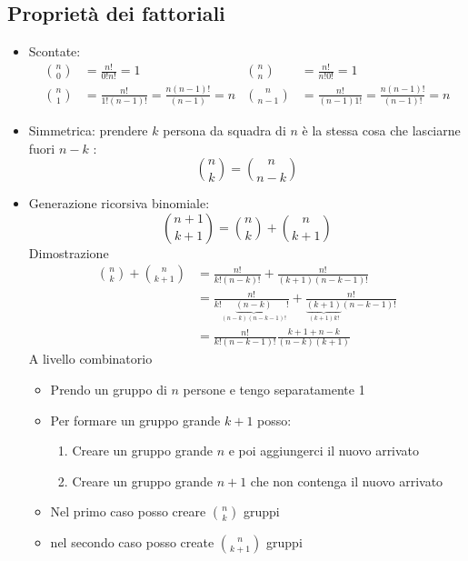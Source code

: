 \subsection{Proprietà dei fattoriali}
\begin{itemize}
	\item Scontate:
	      \begin{align*}
		      \binom{n}{0} & =  \frac{n!}{0!n!}= 1                                                                       & \binom{n}{n}   & =  \frac{n!}{n!0!}= 1                                                                    \\
		      \binom{n}{1} & =  \frac{n!}{1!\left( n-1 \right) !}=  \frac{n \left( n-1 \right) !}{\left( n-1 \right) }=n & \binom{n}{n-1} & = \frac{n!}{\left( n-1 \right) 1!}= \frac{n\left( n-1 \right) !}{\left( n-1 \right) !}=n
	      \end{align*}
	\item Simmetrica: prendere $k$ persona da squadra di $n$ è la stessa cosa che lasciarne fuori $n-k$ :
	      \[
		      \binom{n}{k}= \binom{n}{n-k}
	      \]
	\item Generazione ricorsiva binomiale:
	      \[
		      \binom{n+1}{k+1} = \binom{n}{k} + \binom{n}{k+1}
	      \]
	      Dimostrazione
	      \begin{align*}
		      \binom{n}{k} + \binom{n}{k+1} & =  \frac{n!}{k! \left( n-k \right) !} + \frac{n!}{\left( k+1 \right) \left( n-k-1 \right) !}                                                                                              \\
		                                    & = \frac{n!}{k! \underbrace{\left( n-k \right)}_{\left( n-k \right) \left( n-k-1 \right) !} !} + \frac{n!}{\underbrace{\left( k+1 \right)}_{\left( k+1 \right) k!} \left( n-k-1 \right) !} \\
		                                    & = \frac{n!}{k! \left( n-k-1 \right) !} \frac{k+1 +n-k}{\left( n-k \right) \left( k+1 \right) }
	      \end{align*}
	      A livello combinatorio
	      \begin{itemize}
		      \item Prendo un gruppo di $n$ persone e tengo separatamente 1
		      \item Per formare un gruppo grande $k+1$ posso:
		            \begin{enumerate}
			            \item Creare un gruppo grande $n$ e poi aggiungerci il nuovo arrivato
			            \item Creare un gruppo grande $n+1$ che non contenga il nuovo arrivato
		            \end{enumerate}
		      \item Nel primo caso posso creare $ \binom{n}{k}$ gruppi
		      \item nel secondo caso posso create $ \binom{n}{k+1}$ gruppi
	      \end{itemize}
\end{itemize}
